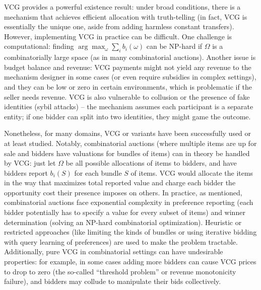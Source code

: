 \documentclass[
  letterpaper,
  numbers=noenddot,
  DIV=11]{scrreprt}
\theoremstyle{plain}
\theoremstyle{definition}
\theoremstyle{remark}
\begin{document}
VCG provides a powerful existence result: under broad conditions, there
is a mechanism that achieves efficient allocation with truth-telling (in
fact, VCG is essentially the unique one, aside from adding harmless
constant transfers). However, implementing VCG in practice can be
difficult. One challenge is computational: finding
\(\arg\max_{\omega}\sum_i b_i(\omega)\) can be NP-hard if \(\Omega\) is
a combinatorially large space (as in many combinatorial auctions).
Another issue is budget balance and revenue: VCG payments might not
yield any revenue to the mechanism designer in some cases (or even
require subsidies in complex settings), and they can be low or zero in
certain environments, which is problematic if the seller needs revenue.
VCG is also vulnerable to collusion or the presence of fake identities
(sybil attacks) -- the mechanism assumes each participant is a separate
entity; if one bidder can split into two identities, they might game the
outcome.

Nonetheless, for many domains, VCG or variants have been successfully
used or at least studied. Notably, combinatorial auctions (where
multiple items are up for sale and bidders have valuations for bundles
of items) can in theory be handled by VCG: just let \(\Omega\) be all
possible allocations of items to bidders, and have bidders report
\(b_i(S)\) for each bundle \(S\) of items. VCG would allocate the items
in the way that maximizes total reported value and charge each bidder
the opportunity cost their presence imposes on others. In practice, as
mentioned, combinatorial auctions face exponential complexity in
preference reporting (each bidder potentially has to specify a value for
every subset of items) and winner determination (solving an NP-hard
combinatorial optimization). Heuristic or restricted approaches (like
limiting the kinds of bundles or using iterative bidding with query
learning of preferences) are used to make the problem tractable.
Additionally, pure VCG in combinatorial settings can have undesirable
properties: for example, in some cases adding more bidders can cause VCG
prices to drop to zero (the so-called ``threshold problem'' or revenue
monotonicity failure), and bidders may collude to manipulate their bids
collectively.
\end{document}
